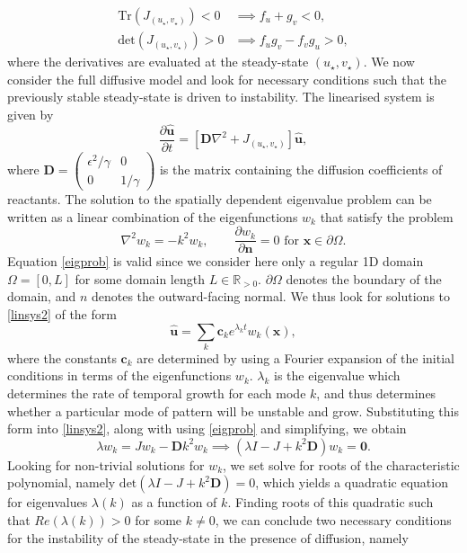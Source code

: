 \documentclass[12pt,a4paper]{report}
\begin{document}
\begin{equation}\label{cond1}
    \begin{split}
\text{Tr}(J_{(u_\star,v_\star)})<0 &\implies f_u+g_v<0, \\
\text{det}(J_{(u_\star,v_\star)})>0 &\implies f_ug_v-f_vg_u>0,
\end{split}
\end{equation}
where the derivatives are evaluated at the steady-state $(u_\star,v_\star)$.
We now consider the full diffusive model and look for necessary conditions such that the previously stable steady-state is driven to instability. The linearised system is given by
\begin{equation}\label{linsys2}
    \frac{\partial \hat{\textbf{u}}}{\partial t}=\left[\textbf{D}\nabla^2+J_{(u_\star,v_\star)} \right]\hat{\textbf{u}},
\end{equation}
where $\textbf{D}=\begin{pmatrix}\epsilon^2/\gamma&0\\0&1/\gamma\end{pmatrix}$ is the matrix containing the diffusion coefficients of reactants.
The solution to the spatially dependent eigenvalue problem can be written as a linear combination of the eigenfunctions $w_k$ that satisfy the problem
\begin{equation}\label{eigprob}
\nabla^2w_k=-k^2w_k,\quad \quad \frac{\partial w_k}{\partial \textbf{n}}=0\text{ for } \textbf{x}\in\partial\Omega.
\end{equation}
Equation \eqref{eigprob} is valid since we consider here only a regular 1D domain $\Omega=[0,L]$ for some domain length $L\in\mathbb{R}_{>0}$. $\partial\Omega$ denotes the boundary of the domain, and $n$ denotes the outward-facing normal.
We thus look for solutions to \eqref{linsys2} of the form
\begin{equation}
    \hat{\textbf{u}}=\sum_k \textbf{c}_ke^{\lambda_k t}w_k(\textbf{x}),
\end{equation}
where the constants $\textbf{c}_k$ are determined by using a Fourier expansion of the initial conditions in terms of the eigenfunctions $w_k$. $\lambda_k$ is the eigenvalue which determines the rate of temporal growth for each mode $k$, and thus determines whether a particular mode of pattern will be unstable and grow. Substituting this form into \eqref{linsys2}, along with using \eqref{eigprob} and simplifying, we obtain
$$
\lambda w_k=Jw_k-\textbf{D}k^2w_k \implies (\lambda I-J+k^2\textbf{D})w_k=\textbf{0}.
$$
Looking for non-trivial solutions for $w_k$, we set solve for roots of the characteristic polynomial, namely $\text{det}(\lambda I-J+k^2\textbf{D})=0$, which yields a quadratic equation for eigenvalues $\lambda(k)$ as a function of $k$. Finding roots of this quadratic such that $Re(\lambda(k))>0$ for some $k\neq0$, we can conclude two necessary conditions for the instability of the steady-state in the presence of diffusion, namely
\end{document}
